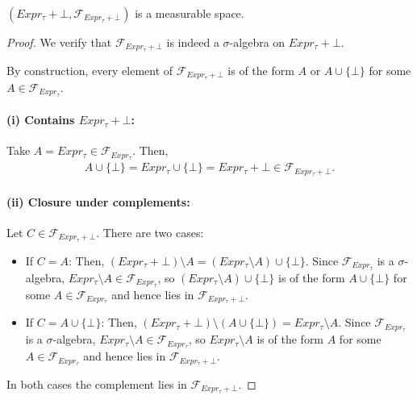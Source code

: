 \begin{lemma}\label{lem:measurable-expr-t-error}
    $(Expr_\tau+\bot,\mathcal F_{Expr_\tau+\bot})$ is a measurable space.
\end{lemma}

\begin{proof}
	We verify that $\mathcal{F}_{Expr_\tau+\bot}$ is indeed a $\sigma$-algebra on $Expr_\tau+\bot$.

	By construction, every element of $\mathcal{F}_{Expr_\tau+\bot}$ is of the form $A$ or $A \cup \{\bot\}$ for some $A \in \mathcal{F}_{Expr_{\tau}}$.

	\paragraph{(i) Contains $Expr_{\tau} + \bot$:}

	Take $A = Expr_{\tau} \in \mathcal{F}_{Expr_{\tau}}$. Then, 
	\begin{align*}
		A \cup \{\bot\} = Expr_{\tau} \cup \{\bot\} = Expr_{\tau} + \bot \in \mathcal{F}_{Expr_{\tau} + \bot}.
	\end{align*}

	\paragraph{(ii) Closure under complements:}
	Let $C \in \mathcal{F}_{Expr_{\tau} + \bot}$. There are two cases:

	\begin{itemize}
		\item If $C = A$: Then, $(Expr_{\tau} + \bot) \setminus A = (Expr_{\tau} \setminus A) \cup \{\bot\}$. Since $\mathcal{F}_{Expr_{\tau}}$ is a $\sigma$-algebra, $Expr_{\tau} \setminus A \in \mathcal{F}_{Expr_{\tau}}$, so $(Expr_{\tau} \setminus A) \cup \{\bot\}$ is of the form $A \cup \{\bot\}$ for some $A \in \mathcal{F}_{Expr_{\tau}}$ and hence lies in $\mathcal{F}_{Expr_{\tau} + \bot}$.
		
		\item If $C = A \cup \{\bot\}$: Then, $(Expr_{\tau} + \bot) \setminus (A \cup \{\bot\}) = Expr_{\tau} \setminus A$. Since $\mathcal{F}_{Expr_{\tau}}$ is a $\sigma$-algebra, $Expr_{\tau} \setminus A \in \mathcal{F}_{Expr_{\tau}}$, so $Expr_{\tau} \setminus A$ is of the form $A$ for some $A \in \mathcal{F}_{Expr_{\tau}}$ and hence lies in $\mathcal{F}_{Expr_{\tau} + \bot}$.
	\end{itemize}

	In both cases the complement lies in $\mathcal{F}_{Expr_{\tau} + \bot}$.



\end{proof}
